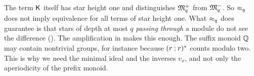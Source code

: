 \begin{remark}
  The term $\mathsf{K}$ itself has star height one and distinguishes $\mathfrak{M}^{+}_q$ from $\mathfrak{M}^{-}_q$.
  So $\approx_{q}$ does not imply equivalence for all terms of star height one.
  What $\approx_{q}$ does guarantee is that stars of depth at most $q$ \emph{passing through} a module do not see the difference ().
  The amplification in  makes this enough.
  The suffix monoid $\mathbb{Q}$ may contain nontrivial groups, for instance because $(r \mathbin{;} r)^{*}$ counts modulo two.
  This is why we need the minimal ideal and the inverses $v_x$, and not only the aperiodicity of the prefix monoid.
\end{remark}
